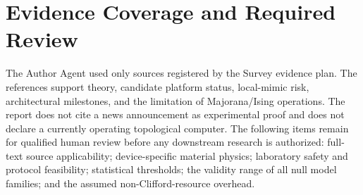 \documentclass[conference]{IEEEtran}
\begin{document}
\section{Evidence Coverage and Required Review}

The Author Agent used only sources registered by the Survey evidence plan. The references support theory, candidate platform status, local-mimic risk, architectural milestones, and the limitation of Majorana/Ising operations. The report does not cite a news announcement as experimental proof and does not declare a currently operating topological computer. The following items remain for qualified human review before any downstream research is authorized: full-text source applicability; device-specific material physics; laboratory safety and protocol feasibility; statistical thresholds; the validity range of all null model families; and the assumed non-Clifford-resource overhead.
\end{document}
